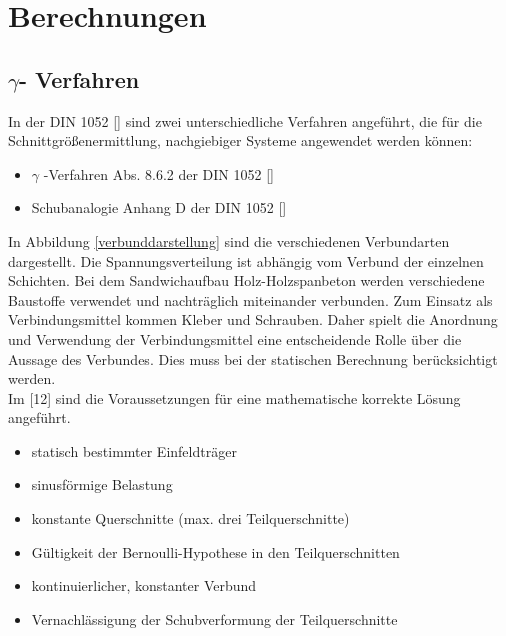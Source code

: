 \chapter{Berechnungen}

\section{$\gamma$- Verfahren}

In der DIN 1052 [] sind zwei unterschiedliche Verfahren angeführt, die für die Schnittgrößenermittlung, nachgiebiger Systeme angewendet werden können:
\\
\begin{itemize}
\item $\gamma$ -Verfahren Abs. 8.6.2 der DIN 1052 []
\item Schubanalogie Anhang D der DIN 1052 []
\end{itemize}
 
In Abbildung \ref{verbunddarstellung} sind die verschiedenen Verbundarten dargestellt. Die Spannungsverteilung ist abhängig vom Verbund der einzelnen Schichten. Bei dem Sandwichaufbau
Holz-Holzspanbeton werden verschiedene Baustoffe verwendet und nachträglich miteinander
verbunden. Zum Einsatz als Verbindungsmittel kommen Kleber und Schrauben.
Daher spielt die Anordnung und Verwendung der Verbindungsmittel eine entscheidende
Rolle über die Aussage des Verbundes. Dies muss bei der statischen Berechnung berücksichtigt
werden. \\
Im [12] sind die Voraussetzungen für eine mathematische korrekte Lösung angeführt. \\

\begin{itemize}
\item statisch bestimmter Einfeldträger
\item sinusförmige Belastung
\item konstante Querschnitte (max. drei Teilquerschnitte)
\item Gültigkeit der Bernoulli-Hypothese in den Teilquerschnitten
\item kontinuierlicher, konstanter Verbund
\item Vernachlässigung der Schubverformung der Teilquerschnitte
\end{itemize}


